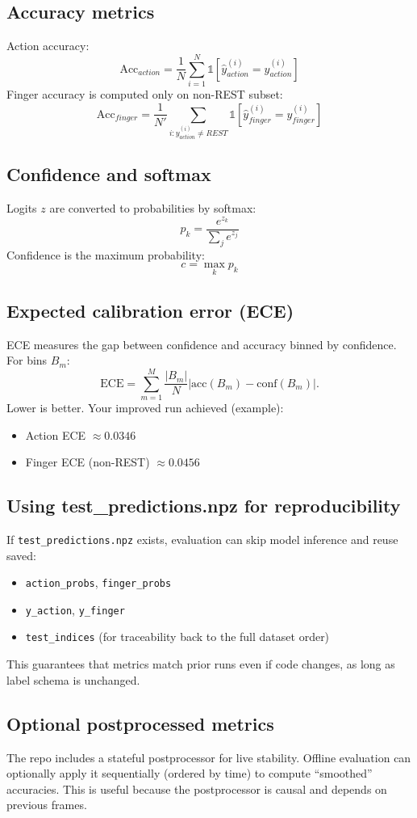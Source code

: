 \documentclass[11pt]{article}
\begin{document}
\subsection{Accuracy metrics}
Action accuracy:
\[
\mathrm{Acc}_{action} = \frac{1}{N}\sum_{i=1}^N \mathbb{1}[\hat{y}^{(i)}_{action} = y^{(i)}_{action}]
\]
Finger accuracy is computed only on non-REST subset:
\[
\mathrm{Acc}_{finger} = \frac{1}{N'}\sum_{i: y^{(i)}_{action}\neq REST} \mathbb{1}[\hat{y}^{(i)}_{finger} = y^{(i)}_{finger}]
\]

\subsection{Confidence and softmax}
Logits $z$ are converted to probabilities by softmax:
\[
p_k = \frac{e^{z_k}}{\sum_j e^{z_j}}
\]
Confidence is the maximum probability:
\[
c = \max_k p_k
\]

\subsection{Expected calibration error (ECE)}
ECE measures the gap between confidence and accuracy binned by confidence. For bins $B_m$:
\[
\mathrm{ECE} = \sum_{m=1}^M \frac{|B_m|}{N}\left|\mathrm{acc}(B_m) - \mathrm{conf}(B_m)\right|.
\]
Lower is better. Your improved run achieved (example):
\begin{itemize}[leftmargin=*]
\item Action ECE $\approx 0.0346$
\item Finger ECE (non-REST) $\approx 0.0456$
\end{itemize}

\subsection{Using test\_predictions.npz for reproducibility}
If \texttt{test\_predictions.npz} exists, evaluation can skip model inference and reuse saved:
\begin{itemize}[leftmargin=*]
\item \texttt{action\_probs}, \texttt{finger\_probs}
\item \texttt{y\_action}, \texttt{y\_finger}
\item \texttt{test\_indices} (for traceability back to the full dataset order)
\end{itemize}
This guarantees that metrics match prior runs even if code changes, as long as label schema is unchanged.

\subsection{Optional postprocessed metrics}
The repo includes a stateful postprocessor for live stability. Offline evaluation can optionally apply it sequentially (ordered by time) to compute ``smoothed'' accuracies. This is useful because the postprocessor is causal and depends on previous frames.
\end{document}

